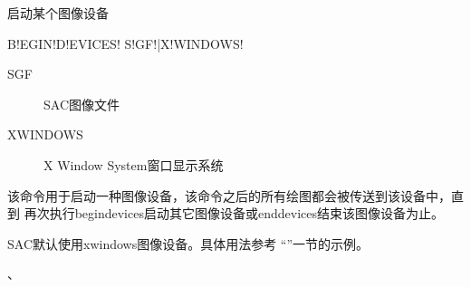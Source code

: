 \label{cmd:begindevices}

启动某个图像设备

\begin{SACSTX}
B!EGIN!D!EVICES! S!GF!|X!WINDOWS!
\end{SACSTX}

\begin{description}
\item [SGF] SAC图像文件
\item [XWINDOWS] X Window System窗口显示系统
\end{description}

该命令用于启动一种图像设备，该命令之后的所有绘图都会被传送到该设备中，直到
再次执行begindevices启动其它图像设备或enddevices结束该图像设备为止。

SAC默认使用xwindows图像设备。具体用法参考 ``''一节的示例。

、
